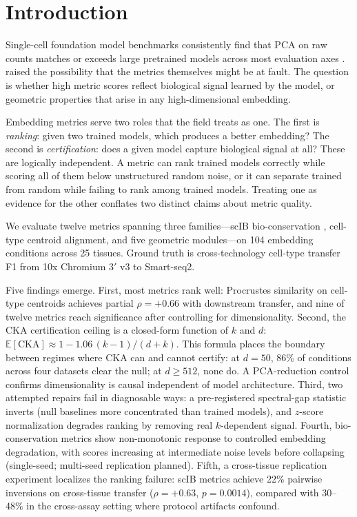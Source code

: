\documentclass[11pt]{article}
\begin{document}
\section{Introduction}
\label{sec:intro}

Single-cell foundation model benchmarks consistently find that PCA on
raw counts matches or exceeds large pretrained models across most
evaluation axes \citep{wu2025scfm, vcbench2026, unifiedscfm2026,
cellxgeneintegration2026}. \citet{wu2025scfm} raised the possibility
that the metrics themselves might be at fault. The question is whether
high metric scores reflect biological signal learned by the model, or
geometric properties that arise in any high-dimensional embedding.

Embedding metrics serve two roles that the field treats as one. The
first is \emph{ranking}: given two trained models, which produces a
better embedding? The second is \emph{certification}: does a given
model capture biological signal at all? These are logically independent.
A metric can rank trained models correctly while scoring all of them
below unstructured random noise, or it can separate trained from random
while failing to rank among trained models. Treating one as evidence for
the other conflates two distinct claims about metric quality.

We evaluate twelve metrics spanning three families---scIB
bio-conservation \citep{luecken2022scib}, cell-type centroid alignment,
and five geometric modules---on 104 embedding conditions across 25
tissues. Ground truth is cross-technology cell-type transfer F1 from
10x Chromium 3$'$ v3 to Smart-seq2.

Five findings emerge. First, most metrics rank well: Procrustes
similarity on cell-type centroids achieves partial $\rho = +0.66$ with
downstream transfer, and nine of twelve metrics reach significance after
controlling for dimensionality. Second, the CKA certification ceiling is
a closed-form function of $k$ and $d$:
$\mathbb{E}[\mathrm{CKA}] \approx 1 - 1.06\,(k{-}1)/(d{+}k)$. This
formula places the boundary between regimes where CKA can and cannot
certify: at $d = 50$, 86\% of conditions across four datasets clear the
null; at $d \geq 512$, none do. A PCA-reduction control confirms
dimensionality is causal independent of model architecture. Third, two
attempted repairs fail in diagnosable ways: a pre-registered
spectral-gap statistic inverts (null baselines more concentrated than
trained models), and $z$-score normalization degrades ranking by
removing real $k$-dependent signal. Fourth, bio-conservation metrics
show non-monotonic response to controlled embedding degradation, with
scores increasing at intermediate noise levels before collapsing
(single-seed; multi-seed replication planned). Fifth, a cross-tissue
replication experiment localizes the ranking failure: scIB metrics
achieve 22\% pairwise inversions on cross-tissue transfer
($\rho = +0.63$, $p = 0.0014$), compared with 30--48\% in the
cross-assay setting where protocol artifacts confound.
\end{document}
